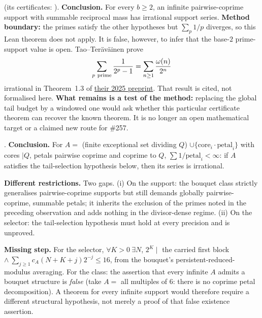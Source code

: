 \begin{obs}
(its certificates:
).
\textbf{Conclusion.} For every $b\ge2$, an infinite pairwise-coprime support with
summable reciprocal mass has irrational support series.
\textbf{Method boundary:} the primes satisfy the other hypotheses but
$\sum_p1/p$ diverges, so this Lean theorem does not apply.  It is false,
however, to infer that the base-$2$ prime-support value is open.
Tao--Ter\"av\"ainen prove
\[
 \sum_{p\ {\rm prime}}\frac1{2^p-1}
 =\sum_{n\ge1}\frac{\omega(n)}{2^n}
\]
irrational in Theorem~1.3 of
\href{https://arxiv.org/abs/2512.01739}{their 2025 preprint}.  That result is
cited, not formalised here.
\textbf{What remains is a test of the method:} replacing the global tail budget by a
windowed one would ask whether this particular certificate theorem can recover
the known theorem.  It is no longer an open mathematical target or a claimed
new route for \#257.
\end{obs}

\begin{obs}
.
\textbf{Conclusion.} For $A=$ (finite exceptional set dividing $Q$) $\cup \{\mathrm{core}_i \cdot
\mathrm{petal}_i\}$ with cores $\mid Q$, petals pairwise coprime and coprime to $Q$, $\sum
1/\mathrm{petal}_i<\infty$: if $A$ satisfies the tail-selection hypothesis below, then its
series is irrational.

\par\medskip

\textbf{Different restrictions.} Two gaps. (i) On the support: the bouquet class strictly
generalises pairwise-coprime supports but still demands globally pairwise-coprime, summable
petals; it inherits the exclusion of the primes noted in the preceding observation and adds
nothing in the divisor-dense regime. (ii) On the selector: the tail-selection hypothesis must
hold at every precision and is unproved.

\par\medskip

\textbf{Missing step.} For the selector, $\forall K{>}0\ \exists N$, $2^K \mid$ the carried first
block $\wedge\ \sum_{j\ge1}c_{A}(N{+}K{+}j)2^{-j}\le16$, from the
bouquet's persistent-reduced-modulus averaging. For the class: the assertion that every infinite $A$ admits a
bouquet structure is \emph{false} (take $A=$ all multiples of 6: there is no coprime
petal decomposition).  A theorem for every infinite support would
therefore require a different structural hypothesis, not merely a
proof of that false existence assertion.
\end{obs}

